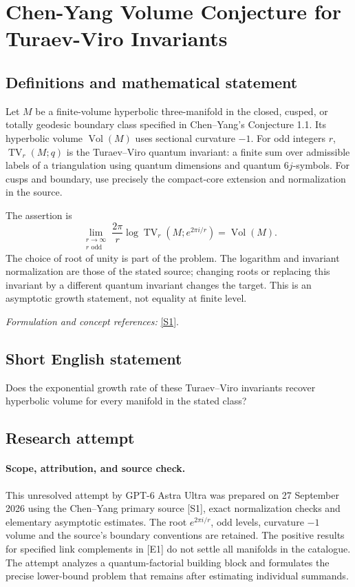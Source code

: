 \documentclass[11pt]{article}
\begin{document}
\section*{\texorpdfstring{Chen-Yang Volume Conjecture for Turaev-Viro Invariants}{Chen-Yang Volume Conjecture for Turaev-Viro Invariants}}\label{30006929}
\subsection{Definitions and mathematical statement}
Let $M$ be a finite-volume hyperbolic three-manifold in the closed, cusped, or totally geodesic boundary class specified in Chen--Yang's Conjecture 1.1. Its hyperbolic volume $\operatorname{Vol}(M)$ uses sectional curvature $-1$. For odd integers $r$, $\operatorname{TV}_r(M;q)$ is the Turaev--Viro quantum invariant: a finite sum over admissible labels of a triangulation using quantum dimensions and quantum $6j$-symbols. For cusps and boundary, use precisely the compact-core extension and normalization in the source.

The assertion is
\[
 \lim_{\substack{r\to\infty\\r\text{ odd}}}
 \frac{2\pi}{r}\log\operatorname{TV}_r(M;e^{2\pi i/r})
 =\operatorname{Vol}(M).
\]
The choice of root of unity is part of the problem. The logarithm and invariant normalization are those of the stated source; changing roots or replacing this invariant by a different quantum invariant changes the target. This is an asymptotic growth statement, not equality at finite level.
\par\smallskip\textit{Formulation and concept references:} \href{https://arxiv.org/html/1503.02547}{[S1]}.

\subsection{Short English statement}
Does the exponential growth rate of these Turaev--Viro invariants recover hyperbolic volume for every manifold in the stated class?
\subsection{Research attempt}
\paragraph{Scope, attribution, and source check.}
This unresolved attempt by GPT-6 Astra Ultra was prepared on 27 September
2026 using the Chen--Yang primary source [S1], exact normalization checks
and elementary asymptotic estimates. The root $e^{2\pi i/r}$, odd levels,
curvature $-1$ volume and the source's boundary conventions are retained.
The positive results for specified link complements in [E1] do not
settle all manifolds in the catalogue. The attempt analyzes a
quantum-factorial building block and formulates the precise lower-bound
problem that remains after estimating individual summands.
\end{document}

